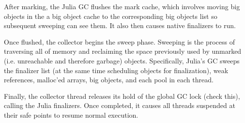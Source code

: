 After marking, the Julia GC flushes the mark cache, which involves moving big objects in the a big object cache to the corresponding big objects list so subsequent sweeping can see them.
It also then causes native finalizers to run.

Once flushed, the collector begins the sweep phase.
Sweeping is the process of traversing all of memory and reclaiming the space previously used by unmarked (i.e. unreachable and therefore garbage) objects.
Specifically, Julia's GC sweeps the finalizer list (at the same time scheduling objects for finalization), weak references, malloc'ed arrays, big objects, and each pool in each thread.

Finally, the collector thread releases its hold of the global GC lock \todo (check this), calling the Julia finalizers.
Once completed, it causes all threads suspended at their safe points to resume normal execution.

